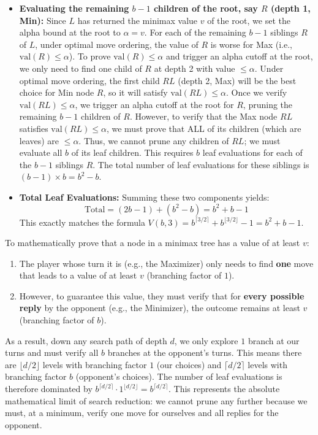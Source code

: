 \documentclass[12pt,addpoints]{exam}
\begin{document}
\begin{questions}
\begin{parts}
\begin{solution}
\begin{subparts}
\begin{itemize}
        \item \textbf{Evaluating the remaining $b-1$ children of the root, say $R$ (depth 1, Min):}
        Since $L$ has returned the minimax value $v$ of the root, we set the alpha bound at the root to $\alpha = v$. For each of the remaining $b-1$ siblings $R$ of $L$, under optimal move ordering, the value of $R$ is worse for Max (i.e., $\text{val}(R) \le \alpha$). 
        To prove $\text{val}(R) \le \alpha$ and trigger an alpha cutoff at the root, we only need to find one child of $R$ at depth 2 with value $\le \alpha$. Under optimal move ordering, the first child $RL$ (depth 2, Max) will be the best choice for Min node $R$, so it will satisfy $\text{val}(RL) \le \alpha$.
        Once we verify $\text{val}(RL) \le \alpha$, we trigger an alpha cutoff at the root for $R$, pruning the remaining $b-1$ children of $R$.
        However, to verify that the Max node $RL$ satisfies $\text{val}(RL) \le \alpha$, we must prove that ALL of its children (which are leaves) are $\le \alpha$. Thus, we cannot prune any children of $RL$; we must evaluate all $b$ of its leaf children.
        This requires $b$ leaf evaluations for each of the $b-1$ siblings $R$. The total number of leaf evaluations for these siblings is $(b-1) \times b = b^2 - b$.
        
        \item \textbf{Total Leaf Evaluations:}
        Summing these two components yields:
        $$\text{Total} = (2b - 1) + (b^2 - b) = b^2 + b - 1$$
        This exactly matches the formula $V(b,3) = b^{\lceil 3/2 \rceil} + b^{\lfloor 3/2 \rfloor} - 1 = b^2 + b - 1$.
    \end{itemize}
    
    \subpart To mathematically prove that a node in a minimax tree has a value of at least $v$:
    \begin{enumerate}
        \item The player whose turn it is (e.g., the Maximizer) only needs to find \textbf{one} move that leads to a value of at least $v$ (branching factor of $1$).
        \item However, to guarantee this value, they must verify that for \textbf{every possible reply} by the opponent (e.g., the Minimizer), the outcome remains at least $v$ (branching factor of $b$).
    \end{enumerate}
    As a result, down any search path of depth $d$, we only explore $1$ branch at our turns and must verify all $b$ branches at the opponent's turns. 
    This means there are $\lfloor d/2 \rfloor$ levels with branching factor $1$ (our choices) and $\lceil d/2 \rceil$ levels with branching factor $b$ (opponent's choices). The number of leaf evaluations is therefore dominated by $b^{\lceil d/2 \rceil} \cdot 1^{\lfloor d/2 \rfloor} = b^{\lceil d/2 \rceil}$.
    This represents the absolute mathematical limit of search reduction: we cannot prune any further because we must, at a minimum, verify one move for ourselves and all replies for the opponent.
\end{subparts}
\end{solution}


\end{parts}
\end{questions}
\end{document}
